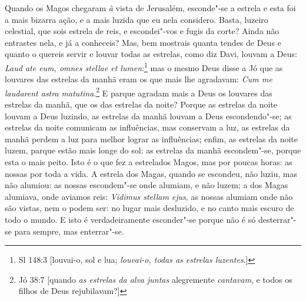 Quando os Magos chegaram \emph{à} vista de Jerusalém, esconde"-se a
estrela e esta foi a mais bizarra ação, e a mais luzida que eu nela
considero. Basta, luzeiro celestial, que sois estrela de reis, e
escondei"-vos e fugis da corte? Ainda não entrastes nela, e já a
conheceis? Mas, bem mostrais quanta tendes de Deus e quanto o quereis
servir e louvar todas as estrelas, como diz Davi, louvam a Deus:
\emph{Laud ate eum, omnes stellae et lumen}:\footnote{Sl 148:3 [louvai-o, sol e lua; \emph{louvai-o, todas as estrelas luzentes}.]} mas o mesmo
Deus disse a Jó que as louvares das estrelas da manhã eram os que mais
lhe agradavam: \emph{Cum me laudarent astra matutina}.\footnote{Jó 38:7 [quando \emph{as estrelas da alva juntas} alegremente \emph{cantavam}, e todos os filhos de Deus rejubilavam?]} E
parque agradam mais a Deus os louvares das estrelas da manhã, que os das
estrelas da noite? Porque as estrelas da noite louvam a Deus luzindo, as
estrelas da manhã louvam a Deus escondendo"-se; as estrelas da noite
comunicam as influências, mas conservam a luz, as estrelas da manhã
perdem a luz para melhor lograr as influências; enfim, as estrelas da
noite luzem, parque estão mais longe do sol: as estrelas da manhã
escondem"-se, porque esta o mais peito. Isto é o que fez a estrelados
Magos, mas por poucas horas: as nossas por toda a vida. A estrela dos
Magas, quando se escondeu, não luziu, mas não alumiou: as nossas
escondem"-se onde alumiam, e não luzem; a dos Magas alumiava, onde
aviamos reis: \emph{Vidimus stellam ejus}, as nossas alumiam onde não
são vistas, nem o podem ser: no lugar mais desluzido, e no canto mais
escuro de todo o mundo. E isto é verdadeiramente esconder"-se porque não
é só desterrar"-se para sempre, mas enterrar"-se.

